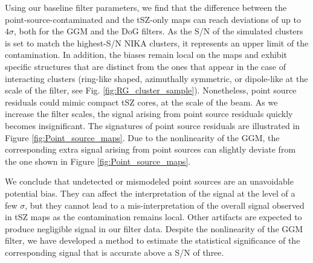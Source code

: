 \documentclass[traditabstract]{aa}
\begin{document}
Using our baseline filter parameters, we find that the difference between the point-source-contaminated and the tSZ-only maps can reach deviations of up to $4 \sigma$, both for the GGM and the DoG filters. As the S/N of the simulated clusters is set to match the highest-S/N NIKA clusters, it represents an upper limit of the contamination. In addition, the biases remain local on the maps and exhibit specific structures that are distinct from the ones that appear in the case of interacting clusters (ring-like shaped, azimuthally symmetric, or dipole-like at the scale of the filter, see Fig. \ref{fig:RG_cluster_sample}). Nonetheless, point source residuals could mimic compact tSZ cores, at the scale of the beam. As we increase the filter scales, the signal arising from point source residuals quickly becomes insignificant. The signatures of point source residuals are illustrated in Figure \ref{fig:Point_source_maps}. Due to the nonlinearity of the  GGM, the corresponding extra signal arising from point sources can slightly deviate from the one shown in Figure \ref{fig:Point_source_maps}.

We conclude that undetected or mismodeled point sources are an unavoidable potential bias. They can affect the interpretation of the signal at the level of a few $\sigma$, but they cannot lead to a mis-interpretation of the overall signal observed in tSZ maps as the contamination remains local. Other artifacts are expected to produce negligible signal in our filter data. Despite the nonlinearity of the GGM filter, we have developed a method to estimate the statistical significance of the corresponding signal that is accurate above a S/N of three.

\end{document}

